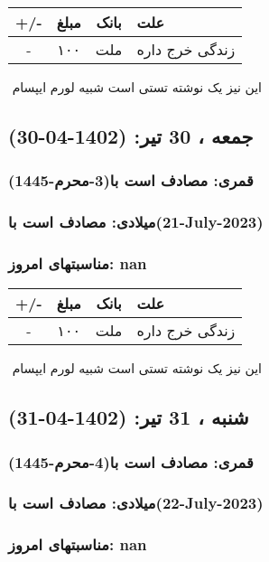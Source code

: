 \documentclass{article}
\newcommand{\rnote}[1]{\marginpar{\textcolor{color}{\StrSubstitute{\##1}{ }{\_}}}}
\newcommand{\myRow}[4]{
    #1 & #2 & #3 & #4 \\ \hline
}
\begin{document}
\begin{tabular}{ | c | c | c | p{5cm} |}
    \hline
    \myRow{ +/- }{مبلغ}{بانک}{علت}
    \myRow{-}{۱۰۰}{ملت}{زندگی خرج داره}
\end{tabular}
\newline
\newline

‌
\rnote{تست}
این نیز یک نوشته تستی است شبیه لورم ایپسام




\newpage
{}
\textcolor{color}{
\section{ جمعه ، 30 تیر: (1402-04-30) }
\subsubsection*{قمری: مصادف است با(3-محرم-1445)} 
\subsubsection*{میلادی: مصادف است با(21-July-2023)}
\subsubsection*{مناسبتهای امروز: nan}
}


\begin{tabular}{ | c | c | c | p{5cm} |}
    \hline
    \myRow{ +/- }{مبلغ}{بانک}{علت}
    \myRow{-}{۱۰۰}{ملت}{زندگی خرج داره}
\end{tabular}
\newline
\newline

‌
\rnote{تست}
این نیز یک نوشته تستی است شبیه لورم ایپسام




\newpage
{}
\textcolor{color}{
\section{ شنبه ، 31 تیر: (1402-04-31) }
\subsubsection*{قمری: مصادف است با(4-محرم-1445)} 
\subsubsection*{میلادی: مصادف است با(22-July-2023)}
\subsubsection*{مناسبتهای امروز: nan}
}
\end{document}
